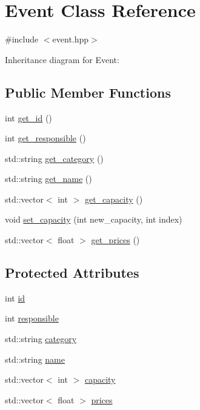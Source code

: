 \hypertarget{class_event}{}\section{Event Class Reference}
\label{class_event}


{\ttfamily \#include $<$event.\+hpp$>$}



Inheritance diagram for Event\+:
\subsection*{Public Member Functions}
\begin{DoxyCompactItemize}
\item 
int \hyperlink{class_event_add4f839bf9fd31c498c428b5ea6ff878}{get\+\_\+id} ()
\item 
int \hyperlink{class_event_ab14e094808f305c5e157c13985a4c20b}{get\+\_\+responsible} ()
\item 
std\+::string \hyperlink{class_event_a3d6d9449df699ab367fd0969d6cd52a0}{get\+\_\+category} ()
\item 
std\+::string \hyperlink{class_event_acf7f2e864ba2d56452ad068193274e6a}{get\+\_\+name} ()
\item 
std\+::vector$<$ int $>$ \hyperlink{class_event_a5cc57ea1523b982b7b4f463ddfd2d04b}{get\+\_\+capacity} ()
\item 
void \hyperlink{class_event_ae9557b078483b093e3c71e6ff2bbac81}{set\+\_\+capacity} (int new\+\_\+capacity, int index)
\item 
std\+::vector$<$ float $>$ \hyperlink{class_event_af541a2123d55c40e200617a0b0b38d05}{get\+\_\+prices} ()
\end{DoxyCompactItemize}
\subsection*{Protected Attributes}
\begin{DoxyCompactItemize}
\item 
int \hyperlink{class_event_a08ba599a781bea8b678251fdb7290890}{id}
\item 
int \hyperlink{class_event_aab3e742a3f882731bd73996f4c66eef1}{responsible}
\item 
std\+::string \hyperlink{class_event_a5634221828f8d3f823598b1fa22e3392}{category}
\item 
std\+::string \hyperlink{class_event_ae116bf76fb01a92e000579a5a0d6f35c}{name}
\item 
std\+::vector$<$ int $>$ \hyperlink{class_event_a75eb887870ee5c4a4bf502d98a7cd6a3}{capacity}
\item 
std\+::vector$<$ float $>$ \hyperlink{class_event_a49d863913759f2294cc4c8bdbc2be9fe}{prices}
\end{DoxyCompactItemize}


